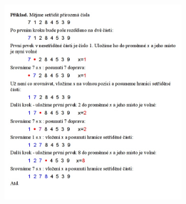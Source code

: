 \documentclass[10pt,a4paper]{article}
\begin{document}
\includegraphics[width=8cm]{img/insert}
\end{document}
